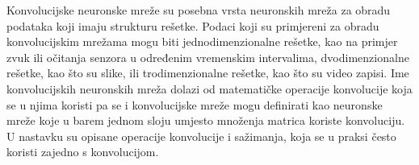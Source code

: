 \nocite{Goodfellow-et-al-2016}

Konvolucijske neuronske mreže su posebna vrsta neuronskih mreža za obradu podataka koji imaju strukturu rešetke. Podaci koji su primjereni za obradu konvolucijskim mrežama mogu biti jednodimenzionalne rešetke, kao na primjer zvuk ili očitanja senzora u određenim vremenskim intervalima, dvodimenzionalne rešetke, kao što su slike, ili trodimenzionalne rešetke, kao što su video zapisi.
Ime konvolucijskih neuronskih mreža dolazi od matematičke operacije konvolucije koja se u njima koristi pa se i konvolucijske mreže mogu definirati kao neuronske mreže koje u barem jednom sloju umjesto množenja matrica koriste konvoluciju.
U nastavku su opisane operacije konvolucije i sažimanja, koja se u praksi često koristi zajedno s konvolucijom.

